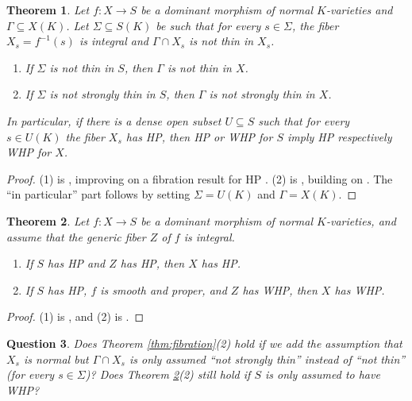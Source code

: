 \documentclass[10pt,a4paper]{amsart}
\theoremstyle{plain}
\newtheorem{theorem}{Theorem}
\newtheorem{question}[theorem]{Question}
\theoremstyle{remark}
\numberwithin{theorem}{section}
\begin{document}
\begin{theorem}\label{thm:mixed_fibration}\label{thm:fibration}
Let $f\colon X\rightarrow S$ be a dominant morphism of normal $K$-varieties
and $\Gamma\subseteq X(K)$.
Let $\Sigma\subseteq S(K)$ be such that for every $s\in\Sigma$, the fiber $X_s=f^{-1}(s)$
is  integral and  $\Gamma\cap X_s$ is not thin in $X_s$.
\begin{enumerate}
    \item If $\Sigma$ is not thin in $S$, then $\Gamma$ is not thin in $X$.
    \item If $\Sigma$ is not strongly thin in $S$, then $\Gamma$ is not strongly thin in $X$.
\end{enumerate}
In particular, if there is a dense open subset $U\subseteq S$ such that for every $s\in U(K)$ the fiber $X_s$ has HP,
then HP or WHP for $S$ imply HP respectively WHP for $X$.
\end{theorem}
\begin{proof}
(1) is \cite[Theorem 1.7]{Luger}, improving on a fibration result for HP \cite[Theorem 1.1]{BFP}.    
(2) is \cite[Theorem 2]{Luger3},
building on \cite[Theorem 1.3]{Javanpeykar22}.
The ``in particular'' part follows by setting $\Sigma=U(K)$ and $\Gamma=X(K)$.
\end{proof}

\begin{theorem}\label{thm:generic_fiber_fibration}
Let $f\colon X\rightarrow S$ be a dominant morphism of normal $K$-varieties,
and assume that the generic fiber $Z$ of $f$ is integral.
\begin{enumerate}
\item If $S$ has HP and $Z$ has HP, then $X$ has HP.
\item If $S$ has HP, $f$ is smooth and proper, and $Z$ has WHP, then $X$ has WHP.
\end{enumerate}
\end{theorem}

\begin{proof}
(1) is \cite[Proposition 3.4]{BFP24},
and (2) is \cite[Theorem 1.6]{Pet25}.
\end{proof}

\begin{question}\label{question:fibrations}
Does Theorem \ref{thm:fibration}(2) hold if
we add the assumption that $X_s$ is normal but
$\Gamma\cap X_s$ is only assumed ``not strongly thin'' instead of ``not thin'' (for every $s\in\Sigma$)?  
Does Theorem \ref{thm:generic_fiber_fibration}(2) still hold if $S$ is only assumed to have WHP?
\end{question}
\end{document}
